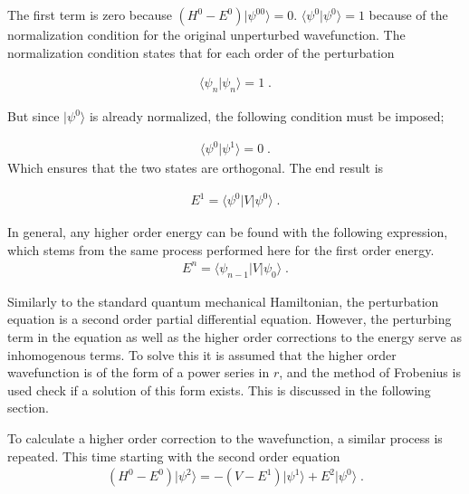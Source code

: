         \noindent The first term is zero because $\left(H^0 - E^0\right)\vert \psi^00 \rangle = 0$. $\langle \psi^0 \vert \psi^0 \rangle = 1$ because of the normalization condition for the original unperturbed wavefunction. The normalization condition states that for each order of the perturbation 
        
        \begin{align}
            \langle \psi_n \vert \psi_n \rangle = 1\;.
        \end{align}

        \noindent But since $\vert \psi^0 \rangle$ is already normalized, the following condition must be imposed;

        \begin{align}
            \langle \psi^0 \vert \psi^1 \rangle = 0\;.
        \end{align}
        \noindent Which ensures that the two states are orthogonal. The end result is

        \begin{align}
            E^1 = \langle \psi^0 \vert V \vert \psi^0 \rangle\;.\label{eq:Energy0_Perturbation}
        \end{align}

        \noindent In general, any higher order energy can be found with the following expression, which stems from the same process performed here for the first order energy.
        \begin{align}
            E^n = \langle \psi_{n-1} \vert V \vert \psi_0 \rangle\;. \label{eq:Energy_Perturbation}
        \end{align}

        \noindent Similarly to the standard quantum mechanical Hamiltonian, the perturbation equation is a second order partial differential equation. However, the perturbing term in the equation as well as the higher order corrections to the energy serve as inhomogenous terms. To solve this it is assumed that the higher order wavefunction is of the form of a power series in $r$, and the method of Frobenius is used check if a solution of this form exists. This is discussed in the following section. 

        To calculate a higher order correction to the wavefunction, a similar process is repeated. This time starting with the second order equation
        \begin{align}
            \left( H^0 - E^0 \right) \vert \psi^2 \rangle = -\left(V - E^1 \right) \vert \psi^1 \rangle + E^2 \vert \psi^0 \rangle\;.
        \end{align}

